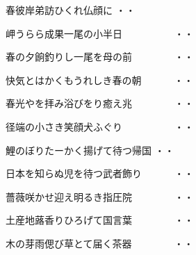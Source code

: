 \vspace{0.4cm}
\begin{shiika}春彼岸弟訪ひくれ仏顔に
\hfill{・・}\end{shiika}
\vspace{0.4cm}
\begin{shiika}岬うらら成果一尾の小半日　　　　　
\hfill{・・}\end{shiika}
\vspace{0.4cm}
\begin{shiika}春の夕餉釣りし一尾を母の前　　　　
\hfill{・・}\end{shiika}
\vspace{0.4cm}
\begin{shiika}快気とはかくもうれしき春の朝　　　
\hfill{・・}\end{shiika}
\vspace{0.4cm}
\begin{shiika}春光やを拝み浴びをり癒え兆　　　　
\hfill{・・}\end{shiika}
\vspace{0.4cm}
\begin{shiika}径端の小さき笑顔犬ふぐり　　　　　
\hfill{・・}\end{shiika}
\vspace{0.4cm}
\begin{shiika}鯉のぼりたーかく揚げて待つ帰国
\hfill{・・}\end{shiika}
\vspace{0.4cm}
\begin{shiika}日本を知らぬ児を待つ武者飾り　　　
\hfill{・・}\end{shiika}
\vspace{0.4cm}
\begin{shiika}薔薇咲かせ迎え明るき指圧院　　　　
\hfill{・・}\end{shiika}
\vspace{0.4cm}
\begin{shiika}土産地蕗香りひろげて国言葉　　　　
\hfill{・・}\end{shiika}
\vspace{0.4cm}
\begin{shiika}木の芽雨偲び草とて届く茶器　　　　
\hfill{・・}\end{shiika}
